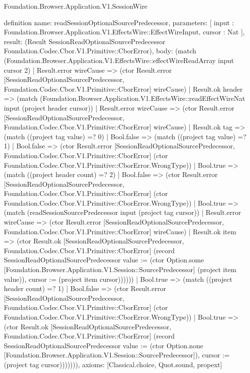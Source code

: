 \begin{lexlean}{Foundation.Browser.Application.V1.SessionWire}
\begin{semanticmodule}
definition{
  name: readSessionOptionalSourcePredecessor,
  parameters: [
    input : Foundation.Browser.Application.V1.EffectsWire::EffectWireInput,
    cursor : Nat
  ],
  result: (Result SessionReadOptionalSourcePredecessor Foundation.Codec.Cbor.V1.Primitive::CborError),
  body: (match (Foundation.Browser.Application.V1.EffectsWire::effectWireReadArray input cursor 2)
    | Result.error wireCause => (ctor Result.error [SessionReadOptionalSourcePredecessor, Foundation.Codec.Cbor.V1.Primitive::CborError] wireCause)
    | Result.ok header => (match (Foundation.Browser.Application.V1.EffectsWire::readEffectWireNat input (project header cursor))
      | Result.error wireCause => (ctor Result.error [SessionReadOptionalSourcePredecessor, Foundation.Codec.Cbor.V1.Primitive::CborError] wireCause)
      | Result.ok tag => (match ((project tag value) =? 0)
        | Bool.false => (match ((project tag value) =? 1)
          | Bool.false => (ctor Result.error [SessionReadOptionalSourcePredecessor, Foundation.Codec.Cbor.V1.Primitive::CborError] (ctor Foundation.Codec.Cbor.V1.Primitive::CborError.WrongType))
          | Bool.true => (match ((project header count) =? 2)
            | Bool.false => (ctor Result.error [SessionReadOptionalSourcePredecessor, Foundation.Codec.Cbor.V1.Primitive::CborError] (ctor Foundation.Codec.Cbor.V1.Primitive::CborError.WrongType))
            | Bool.true => (match (readSessionSourcePredecessor input (project tag cursor))
              | Result.error wireCause => (ctor Result.error [SessionReadOptionalSourcePredecessor, Foundation.Codec.Cbor.V1.Primitive::CborError] wireCause)
              | Result.ok item => (ctor Result.ok [SessionReadOptionalSourcePredecessor, Foundation.Codec.Cbor.V1.Primitive::CborError] (record SessionReadOptionalSourcePredecessor {value := (ctor Option.some [Foundation.Browser.Application.V1.Session::SourcePredecessor] (project item value)), cursor := (project item cursor)})))))
        | Bool.true => (match ((project header count) =? 1)
          | Bool.false => (ctor Result.error [SessionReadOptionalSourcePredecessor, Foundation.Codec.Cbor.V1.Primitive::CborError] (ctor Foundation.Codec.Cbor.V1.Primitive::CborError.WrongType))
          | Bool.true => (ctor Result.ok [SessionReadOptionalSourcePredecessor, Foundation.Codec.Cbor.V1.Primitive::CborError] (record SessionReadOptionalSourcePredecessor {value := (ctor Option.none [Foundation.Browser.Application.V1.Session::SourcePredecessor]), cursor := (project tag cursor)})))))),
  axioms: [Classical.choice, Quot.sound, propext]
}


\end{semanticmodule}
\end{lexlean}
